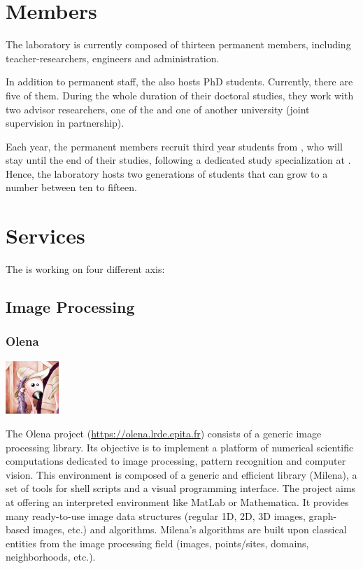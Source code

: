 \section{Members}
The laboratory is currently composed of thirteen permanent members, including teacher-researchers, engineers
and administration.

\noindent In addition to permanent staff, the \LRDE\space also hosts PhD students. Currently, there are five
of them. During the whole duration of their doctoral studies, they work with two advisor researchers, one of
the \LRDE\space and one of another university (joint supervision in partnership).

Each year, the permanent members recruit third year students from \EPITA, who will stay until the
end of their studies, following a dedicated study specialization at \EPITA\space. Hence, the laboratory
hosts two generations of students that can grow to a number between ten to fifteen.


\section{Services}
The \LRDE\space is working on four different axis:


\subsection{Image Processing}
\subsubsection{Olena}
\begin{center}
 \includegraphics[width=2cm]{img/olena.jpg}
\end{center}
The Olena project (\url{https://olena.lrde.epita.fr}) consists of a generic image processing library.
Its objective is to implement a platform of numerical scientific computations dedicated to image
processing, pattern recognition and computer vision. This environment is composed of a generic and
efficient library (Milena), a set of tools for shell scripts and a visual programming interface.
The project aims at offering an interpreted environment like MatLab or Mathematica. It provides many
ready-to-use image data structures (regular 1D, 2D, 3D images, graph-based images, etc.) and algorithms.
Milena's algorithms are built upon classical entities from the image processing field (images, points/sites,
domains, neighborhoods, etc.).\\

